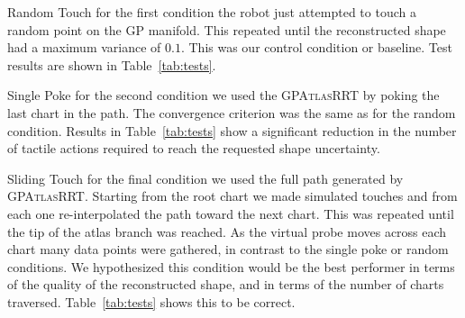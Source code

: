 \begin{asparadesc}
    \item[Random Touch] for the first condition the robot just attempted to touch a random point on the GP manifold. This repeated until the reconstructed shape had a maximum variance of $0.1$. This was our control condition or baseline. Test results are shown in Table~\ref{tab:tests}.
    
    \item[Single Poke] for the second condition we used the \textsc{GPAtlasRRT} by poking the last chart in the path. The convergence criterion was the same as for the random condition. Results in Table~\ref{tab:tests} show a significant reduction
 in the number of tactile actions required to reach the requested shape uncertainty.
 
    \item[Sliding Touch] for the  final condition we  used the full path generated by \textsc{GPAtlasRRT}. Starting from the root chart we made simulated touches and from each one re-interpolated the path toward the next chart. This was repeated until the tip of the atlas branch was reached. As the virtual probe moves across each chart many data points were gathered, in contrast to the single poke or random conditions. We hypothesized this condition would be the best performer in terms of the quality of the reconstructed shape, and in terms of the number of charts traversed. Table~\ref{tab:tests} shows this to be correct.
\end{asparadesc}
